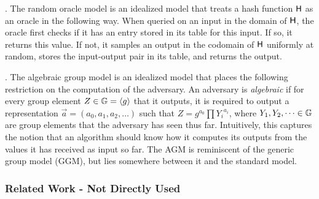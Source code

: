 . The random oracle model is an idealized model that treats a hash function $\mathsf{H}$ as an oracle in the following way.  When queried on an input in the domain of $\mathsf{H}$, the oracle first checks if it has an entry stored in its table for this input.  If so, it returns this value.  If not, it samples an output in the codomain of $\mathsf{H}$ uniformly at random, stores the input-output pair in its table, and returns the output.

. The algebraic group model is an idealized model that places the following restriction on the computation of the adversary. An adversary is \emph{algebraic} if for every group element $Z \in \mathbb{G} = \langle g \rangle$ that it outputs, it is required to output a representation $\vec{a} = (a_0, a_1, a_2, \dots)$ such that $Z = g^{a_0} \prod {Y_i}^{a_i}$, where $Y_1, Y_2, \dots \in \mathbb{G}$ are group elements that the adversary has seen thus far.
Intuitively, this captures the notion that an algorithm should know how it computes its outputs from the values it has received as input so far.
The AGM is reminiscent of the generic group model (GGM), but lies somewhere between it and the standard model.

\subsubsection{Related Work - Not Directly Used}

